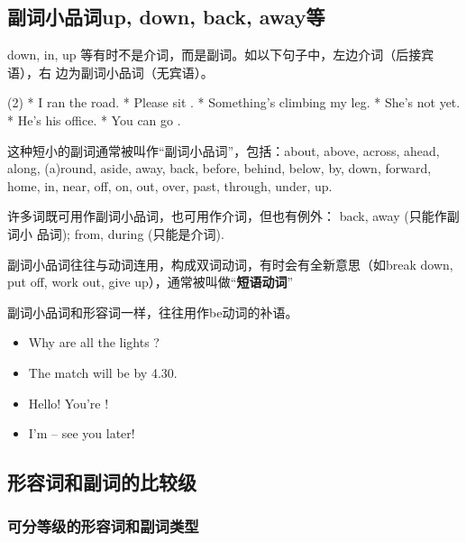 \subsection{副词小品词up, down, back, away等}

down, in, up 等有时不是介词，而是副词。如以下句子中，左边介词（后接宾语），右
边为副词小品词（无宾语）。
\begin{taskitem}(2)
* I ran  the road.
* Please sit .
* Something's climbing  my leg.
* She's not  yet.
* He's  his office.
* You can go .
\end{taskitem}

这种短小的副词通常被叫作“副词小品词”，包括：about, above, across, ahead,
along, (a)round, aside, away, back, before, behind, below, by, down,
forward, home, in, near, off, on, out, over, past, through, under, up.

许多词既可用作副词小品词，也可用作介词，但也有例外： back, away (只能作副词小
品词); from, during (只能是介词).

副词小品词往往与动词连用，构成双词动词，有时会有全新意思（如break down, put
off, work out, give up），通常被叫做“\textbf{短语动词}”

副词小品词和形容词一样，往往用作be动词的补语。
\begin{itemize}
\item Why are all the lights ?
\item The match will be  by 4.30.
\item Hello! You're !
\item I'm  – see you later!
\end{itemize}

\subsection{形容词和副词的比较级}

\subsubsection{可分等级的形容词和副词类型}

